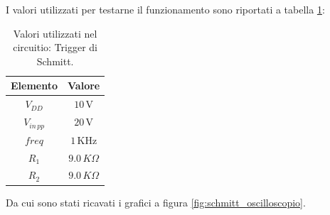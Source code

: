 \documentclass[a4paper,12pt]{article}
\begin{document}
I valori utilizzati per testarne il funzionamento sono riportati a tabella \ref{tab:valori_trigger_schmitt}:
\begin{table}[h]
	\centering
	\setlength{\tabcolsep}{20pt}
	\begin{tabular}{c c}
		\toprule
		Elemento     & Valore            \\
		\midrule
		$V_{DD}$     & $10\,\mathrm{V}$  \\
		$V_{in\,pp}$ & $20\,\mathrm{V}$  \\
		$freq$       & $1\,\mathrm{KHz}$ \\
		$R_1$        & $9.0\,K\Omega$    \\
		$R_2$        & $9.0\,K\Omega$    \\
		\bottomrule
	\end{tabular}
	\caption{Valori utilizzati nel circuitio: Trigger di Schmitt.}
	\label{tab:valori_trigger_schmitt}
\end{table}

Da cui sono stati ricavati i grafici a figura \ref{fig:schmitt_oscilloscopio}.
\end{document}
